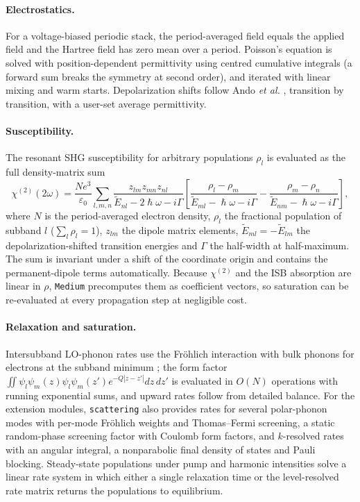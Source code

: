 \documentclass[11pt]{article}
\newcommand{\chitwo}{\chi^{(2)}}
\newcommand{\code}[1]{\texttt{#1}}
\begin{document}
\paragraph{Electrostatics.} For a voltage-biased periodic stack, the period-averaged field equals the applied field and the Hartree field has zero mean over a period. Poisson's equation is solved with position-dependent permittivity using centred cumulative integrals (a forward sum breaks the symmetry at second order), and iterated with linear mixing and warm starts. Depolarization shifts follow Ando \emph{et al.} \cite{Ando1982}, transition by transition, with a user-set average permittivity.

\paragraph{Susceptibility.} The resonant SHG susceptibility for arbitrary populations $\rho_l$ is evaluated as the full density-matrix sum \cite{Boyd2008,Rosencher1991}
\begin{equation}
\chitwo(2\omega)=\frac{Ne^3}{\varepsilon_0}\sum_{l,m,n}\frac{z_{lm}z_{mn}z_{nl}}{\tilde E_{nl}-2\hslash\omega-i\Gamma}\left[\frac{\rho_l-\rho_m}{\tilde E_{ml}-\hslash\omega-i\Gamma}-\frac{\rho_m-\rho_n}{\tilde E_{nm}-\hslash\omega-i\Gamma}\right],
\end{equation}
where $N$ is the period-averaged electron density, $\rho_l$ the fractional population of subband $l$ ($\sum_l\rho_l=1$), $z_{lm}$ the dipole matrix elements, $\tilde E_{ml}=-\tilde E_{lm}$ the depolarization-shifted transition energies and $\Gamma$ the half-width at half-maximum. The sum is invariant under a shift of the coordinate origin and contains the permanent-dipole terms automatically. Because $\chitwo$ and the ISB absorption are linear in $\rho$, \code{Medium} precomputes them as coefficient vectors, so saturation can be re-evaluated at every propagation step at negligible cost.

\paragraph{Relaxation and saturation.} Intersubband LO-phonon rates use the Fr\"ohlich interaction with bulk phonons for electrons at the subband minimum \cite{Ferreira1989}; the form factor $\iint\psi_l\psi_m(z)\psi_l\psi_m(z')e^{-Q|z-z'|}dz\,dz'$ is evaluated in $O(N)$ operations with running exponential sums, and upward rates follow from detailed balance. For the extension modules, \code{scattering} also provides rates for several polar-phonon modes with per-mode Fr\"ohlich weights and Thomas--Fermi screening, a static random-phase screening factor with Coulomb form factors, and $k$-resolved rates with an angular integral, a nonparabolic final density of states and Pauli blocking. Steady-state populations under pump and harmonic intensities solve a linear rate system in which either a single relaxation time or the level-resolved rate matrix returns the populations to equilibrium.
\end{document}
